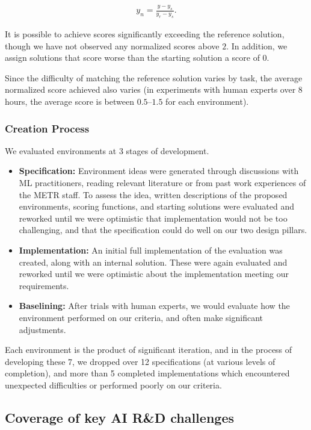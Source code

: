 \documentclass{article}
\begin{document}
\begin{gather*}
    y_n = \frac{y-y_s}{y_r-y_s}.
\end{gather*}

It is possible to achieve scores significantly exceeding the reference solution, though we have not observed any normalized scores above $2$. In addition, we assign solutions that score worse than the starting solution a score of 0.

Since the difficulty of matching the reference solution varies by task, the average normalized score achieved also varies (in experiments with human experts over 8 hours, the average score is between $0.5$--$1.5$ for each environment). 

\subsubsection{Creation Process}

We evaluated environments at 3 stages of development.
\begin{itemize}
    \item \textbf{Specification:} Environment ideas were generated through discussions with ML practitioners, reading relevant literature or from past work experiences of the METR staff. To assess the idea, written descriptions of the proposed environments, scoring functions, and starting solutions were evaluated and reworked until we were optimistic that implementation would not be too challenging, and that the specification could do well on our two design pillars. 
    \item \textbf{Implementation:} An initial full implementation of the evaluation was created, along with an internal solution. These were again evaluated and reworked until we were optimistic about the implementation meeting our requirements. 
    \item \textbf{Baselining:} After trials with human experts, we would evaluate how the environment performed on our criteria, and often make significant adjustments. 
\end{itemize}
Each environment is the product of significant iteration, and in the process of developing these 7, we dropped over 12 specifications (at various levels of completion), and more than 5 completed implementations which encountered unexpected difficulties or performed poorly on our criteria.

\subsection{Coverage of key AI R\&D challenges}\label{subsec:coverage}
\end{document}
